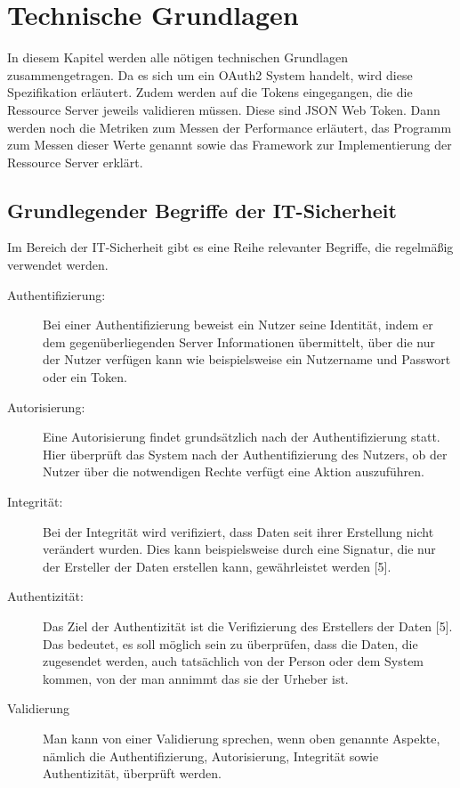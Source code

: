 \chapter{Technische Grundlagen}
\label{sec:TechnischeGrundlagen}
In diesem Kapitel werden alle nötigen technischen Grundlagen zusammengetragen. Da es sich um ein OAuth2 System handelt, wird diese Spezifikation erläutert. Zudem werden auf die Tokens eingegangen, die die Ressource Server jeweils validieren müssen. Diese sind \ac{JSON} Web Token. Dann werden noch die Metriken zum Messen der Performance erläutert, das Programm zum Messen dieser Werte genannt sowie das Framework zur Implementierung der Ressource Server erklärt. 

%
%
\section{Grundlegender Begriffe der IT-Sicherheit}
\label{sec:GrundlegenderBegriffederIT-Sicherheit}
Im Bereich der IT-Sicherheit gibt es eine Reihe relevanter Begriffe, die regelmäßig verwendet werden.

\begin{description}
  \item[Authentifizierung:] Bei einer Authentifizierung beweist ein Nutzer seine Identität, indem er dem gegenüberliegenden Server Informationen übermittelt, über die nur der Nutzer verfügen kann wie beispielsweise ein Nutzername und Passwort oder ein Token.
  \item[Autorisierung:] Eine Autorisierung findet grundsätzlich nach der Authentifizierung statt. Hier überprüft das System nach der Authentifizierung des Nutzers, ob der Nutzer über die notwendigen Rechte verfügt eine Aktion auszuführen. 
  \item[Integrität:] Bei der Integrität wird verifiziert, dass Daten seit ihrer Erstellung nicht verändert wurden. Dies kann beispielsweise durch eine Signatur, die nur der Ersteller der Daten erstellen kann, gewährleistet werden [5].
  \item[Authentizität:] Das Ziel der Authentizität ist die Verifizierung des Erstellers der Daten [5]. Das bedeutet, es soll möglich sein zu überprüfen, dass die Daten, die zugesendet werden, auch tatsächlich von der Person oder dem System kommen, von der man annimmt das sie der Urheber ist.
  \item[Validierung] Man kann von einer Validierung sprechen, wenn oben genannte Aspekte, nämlich die Authentifizierung, Autorisierung, Integrität sowie Authentizität, überprüft werden.
\end{description}

